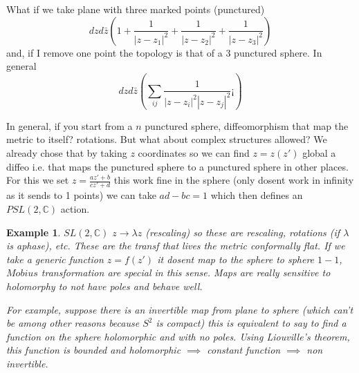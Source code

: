 \documentclass[10pt,
 article,
 amsmath,amssymb
]{revtex4-2}
\newtheorem{example}[theorem]{Example}
\newcommand{\CC}{\mathbb{C}}
\begin{document}
What if we take  plane with three marked points (punctured) $$dz d\bar{z}(1+ \frac{1}{|z-z_1|^2}+\frac{1}{|z-z_2|^2}+\frac{1}{|z-z_3|^2} )$$
and, if I remove one point the topology is that of a 3 punctured sphere.
In general 
\begin{equation}
    dz d\bar{z}(\sum_{ij} \frac{1}{|z-z_i|^2 |z-z_j|^2}¡ )
\end{equation}

In general, if you start from a $n$ punctured sphere, diffeomorphism that map the metric to itself? rotations.
But what about complex structures allowed? We already chose that by taking $z$ coordinates so we can find $z=z(z')$ global 
a diffeo i.e. that maps the punctured sphere to a punctured sphere in other places. For this we set $z=\frac{az'+b}{cz'+d}$ this work fine in 
the sphere (only dosent work in infinity as it sends to 1 points) we can take $ad-bc=1$  which then defines an $PSL(2,\CC)$ action. 

\begin{example}
    $SL(2,\CC)$ $z\to \lambda z$ (rescaling) so these are rescaling, rotations (if $\lambda$ is aphase), etc. These are the transf 
    that lives the metric conformally flat. If we take a generic function $z=f(z')$ it dosent map to the sphere to sphere $1-1$, $Mobius$ transformation 
    are special in this sense. Maps are really sensitive to holomorphy to not have poles and behave well.

    For example, suppose there is an invertible map from plane to sphere (which can't be among other reasons because $S^2$ is compact) this is equivalent 
    to say to find a function on the sphere holomorphic and with no poles. Using Liouville's theorem, this function is bounded 
    and holomorphic $\implies$ constant function $\implies$ non invertible.
\end{example}
\end{document}
